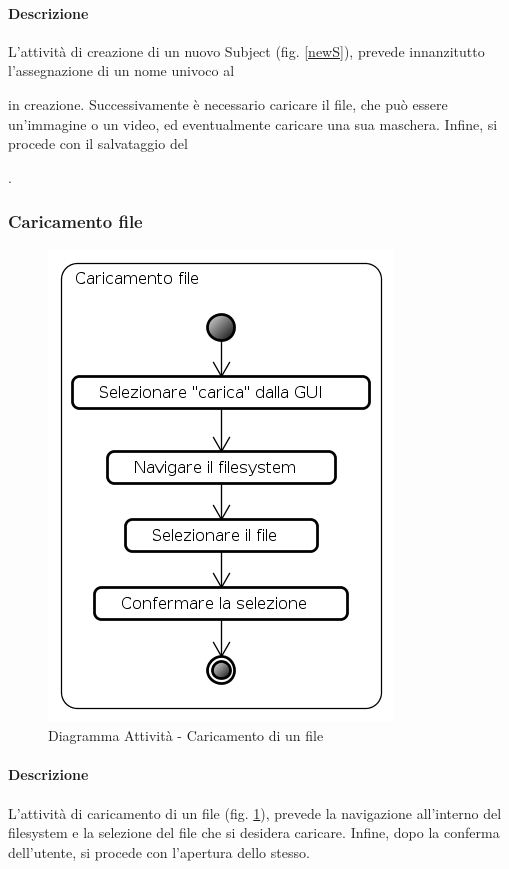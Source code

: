 \paragraph{Descrizione\\}
L'attività di creazione di un nuovo Subject\glossario{} (fig. \ref{newS}), prevede innanzitutto l'assegnazione di un nome univoco al \subject{} in creazione. Successivamente è necessario caricare il file, che può essere un'immagine o un video, ed eventualmente caricare una sua maschera\glossario{}. Infine, si procede con il salvataggio del \subject{}.
\pagebreak

\subsubsection{Caricamento file}
\label{LoadF}
\begin{figure}[!h]
	\centering
	\includegraphics[scale=0.6]{./img/Diagrammi_Attivita/Caricamento_file}
	\caption{Diagramma Attività - Caricamento di un file}
	\label{Load}
\end{figure}
\paragraph{Descrizione\\}
L'attività di caricamento di un file (fig. \ref{Load}), prevede la navigazione all'interno del filesystem e la selezione del file che si desidera caricare. Infine, dopo la conferma dell'utente, si procede con l'apertura dello stesso.
\pagebreak

